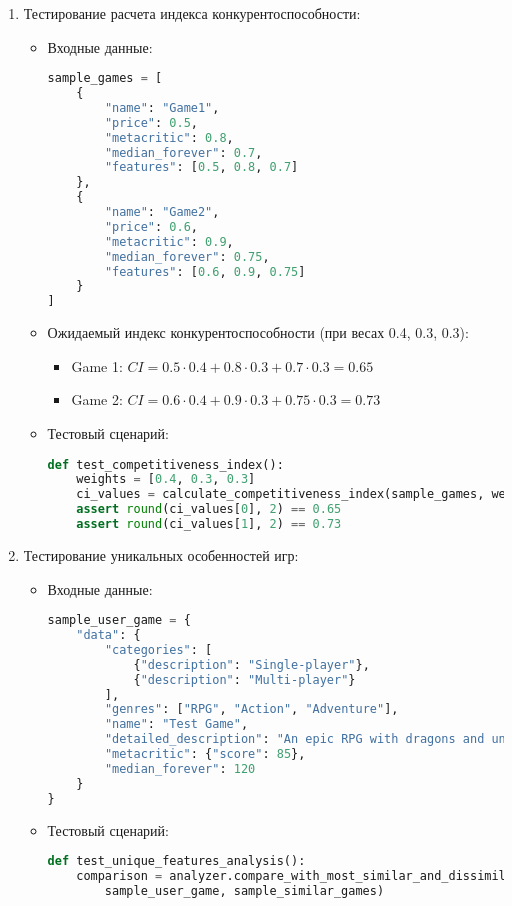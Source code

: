 \documentclass{article}
\begin{document}
\begin{enumerate}[label=\arabic*.]
    \item Тестирование расчета индекса конкурентоспособности:
    \begin{itemize}
        \item Входные данные:
        \begin{lstlisting}[language=Python]
sample_games = [
    {
        "name": "Game1",
        "price": 0.5,
        "metacritic": 0.8,
        "median_forever": 0.7,
        "features": [0.5, 0.8, 0.7]
    },
    {
        "name": "Game2",
        "price": 0.6,
        "metacritic": 0.9,
        "median_forever": 0.75,
        "features": [0.6, 0.9, 0.75]
    }
]
        \end{lstlisting}
        \item Ожидаемый индекс конкурентоспособности (при весах 0.4, 0.3, 0.3):
        \begin{itemize}
            \item Game 1: $CI=0.5\cdot0.4+0.8\cdot0.3+0.7\cdot0.3=0.65$
            \item Game 2: $CI=0.6\cdot0.4+0.9\cdot0.3+0.75\cdot0.3=0.73$
        \end{itemize}
        \item Тестовый сценарий:
        \begin{lstlisting}[language=Python]
def test_competitiveness_index():
    weights = [0.4, 0.3, 0.3]
    ci_values = calculate_competitiveness_index(sample_games, weights)
    assert round(ci_values[0], 2) == 0.65
    assert round(ci_values[1], 2) == 0.73
        \end{lstlisting}
    \end{itemize}

    \item Тестирование уникальных особенностей игр:
    \begin{itemize}
        \item Входные данные:
        \begin{lstlisting}[language=Python]
sample_user_game = {
    "data": {
        "categories": [
            {"description": "Single-player"},
            {"description": "Multi-player"}
        ],
        "genres": ["RPG", "Action", "Adventure"],
        "name": "Test Game",
        "detailed_description": "An epic RPG with dragons and unique combat system!",
        "metacritic": {"score": 85},
        "median_forever": 120
    }
}
        \end{lstlisting}
        \item Тестовый сценарий:
        \begin{lstlisting}[language=Python]
def test_unique_features_analysis():
    comparison = analyzer.compare_with_most_similar_and_dissimilar(
        sample_user_game, sample_similar_games)
    

\end{lstlisting}
\end{itemize}
\end{enumerate}
\end{document}
